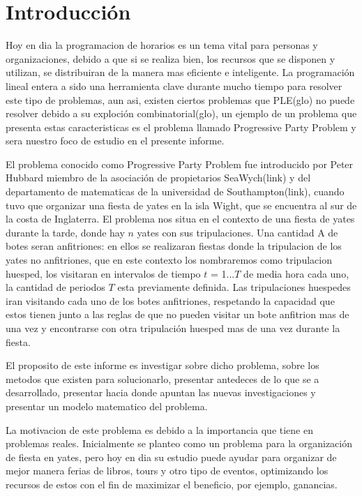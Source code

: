 \documentclass[spanish, fleqn]{article}
\begin{document}
\section{Introducción}

Hoy en dia la programacion de horarios es un tema vital para personas y organizaciones, debido a que si se realiza bien, los recursos que se disponen y utilizan, se distribuiran de la  manera mas eficiente e inteligente. La programación lineal entera a sido una herramienta clave durante mucho tiempo para resolver este tipo de problemas, aun asi, existen ciertos problemas que PLE(glo) no puede resolver debido a su exploción combinatorial(glo), un ejemplo de un problema que presenta estas caracteristicas es el problema llamado Progressive Party Problem y sera nuestro foco de estudio en el presente informe.

El problema conocido como Progressive Party Problem fue introducido por Peter Hubbard miembro de la asociación de propietarios SeaWych(link) y del departamento de matematicas de la universidad de Southampton(link), cuando tuvo que organizar una fiesta de yates en la isla Wight, que se encuentra al sur de la costa de Inglaterra. El problema nos situa en el contexto de una fiesta de yates durante la tarde, donde hay $\mathit{n}$ yates con sus tripulaciones. Una cantidad $\mathrm{A}$ de botes seran anfitriones: en ellos se realizaran fiestas donde la tripulacion de los yates no anfitriones, que en este contexto los nombraremos como tripulacion huesped, los visitaran en intervalos de tiempo $\mathit{t}$ = 1...$\mathit{T}$ de media hora cada uno, la cantidad de periodos $\mathit{T}$ esta previamente definida. Las tripulaciones huespedes iran visitando cada uno de los botes anfitriones, respetando la capacidad que estos tienen junto a las reglas de que no pueden visitar un bote anfitrion mas de una vez y encontrarse con otra tripulación huesped mas de una vez durante la fiesta.

El proposito de este informe es investigar sobre dicho problema, sobre los metodos que existen para solucionarlo, presentar antedeces de lo que se a desarrollado, presentar hacia donde apuntan las nuevas investigaciones y presentar un modelo matematico del problema.

La motivacion de este problema es debido a la importancia que tiene en problemas reales. Inicialmente se planteo como un problema para la organización de fiesta en yates, pero hoy en dia su estudio puede ayudar para organizar de mejor manera ferias de libros, tours y otro tipo de eventos, optimizando los recursos de estos con el fin de maximizar el beneficio, por ejemplo, ganancias.
\end{document}
